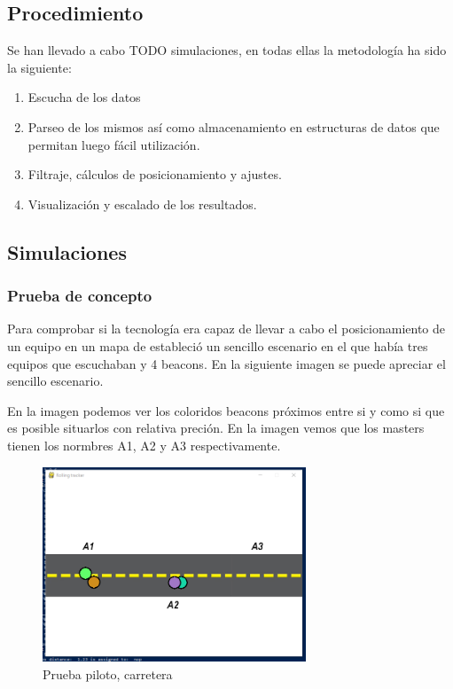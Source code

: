 \documentclass[a4paper ,12pt, onecolumn]{article}
\begin{document}
    \subsection{Procedimiento}
        Se han llevado a cabo TODO simulaciones, en todas ellas la metodología ha sido la siguiente:
        \begin{enumerate}
            \item Escucha de los datos
            \item Parseo de los mismos así como almacenamiento en estructuras de datos que permitan luego fácil utilización.
            \item Filtraje, cálculos de posicionamiento y ajustes.
            \item Visualización y escalado de los resultados.
        \end{enumerate}
    \subsection{Simulaciones}
        \subsubsection{Prueba de concepto}
            Para comprobar si la tecnología era capaz de llevar a cabo el posicionamiento de un equipo en un mapa de estableció un sencillo
            escenario en el que había tres equipos que escuchaban y 4 beacons. En la siguiente imagen se puede apreciar el sencillo escenario.

            En la imagen podemos ver los coloridos beacons próximos entre si y como si que es posible situarlos con relativa preción. En la imagen 
            vemos que los masters tienen los normbres A1, A2 y A3 respectivamente.
            \begin{center}
                \begin{figure}[]
                    \centering
                    \includegraphics[width=0.7\textwidth]{../../Memmory/images/road_1.PNG}
                    \caption{Prueba piloto, carretera}
                    \label{fig:mesh11}
                \end{figure}
            \end{center}
\end{document}
